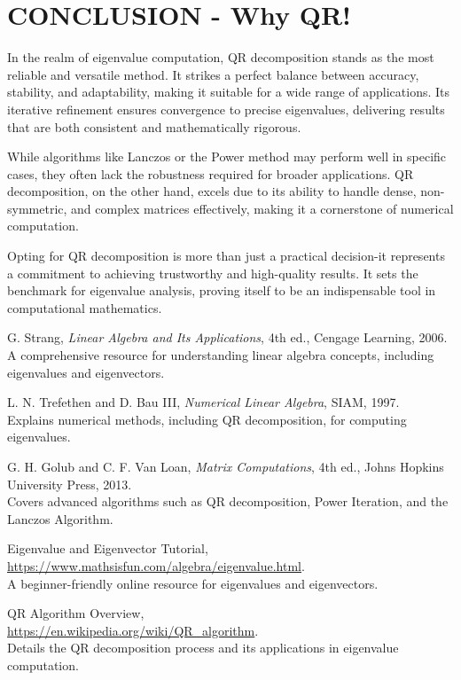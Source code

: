 \documentclass[journal]{IEEEtran}
\begin{document}
\section{CONCLUSION - Why QR!}
In the realm of eigenvalue computation, QR decomposition stands as the most reliable and versatile method. It strikes a perfect balance between accuracy, stability, and adaptability, making it suitable for a wide range of applications. Its iterative refinement ensures convergence to precise eigenvalues, delivering results that are both consistent and mathematically rigorous.

While algorithms like Lanczos or the Power method may perform well in specific cases, they often lack the robustness required for broader applications. QR decomposition, on the other hand, excels due to its ability to handle dense, non-symmetric, and complex matrices effectively, making it a cornerstone of numerical computation.

Opting for QR decomposition is more than just a practical decision-it represents a commitment to achieving trustworthy and high-quality results. It sets the benchmark for eigenvalue analysis, proving itself to be an indispensable tool in computational mathematics.\\

\begin{thebibliography}{9}

G. Strang, 
\textit{Linear Algebra and Its Applications}, 
4th ed., Cengage Learning, 2006. \\
A comprehensive resource for understanding linear algebra concepts, including eigenvalues and eigenvectors.

L. N. Trefethen and D. Bau III, 
\textit{Numerical Linear Algebra}, 
SIAM, 1997. \\
Explains numerical methods, including QR decomposition, for computing eigenvalues.

G. H. Golub and C. F. Van Loan, 
\textit{Matrix Computations}, 
4th ed., Johns Hopkins University Press, 2013. \\
Covers advanced algorithms such as QR decomposition, Power Iteration, and the Lanczos Algorithm.

Eigenvalue and Eigenvector Tutorial, \\
\url{https://www.mathsisfun.com/algebra/eigenvalue.html}. \\
A beginner-friendly online resource for eigenvalues and eigenvectors.

QR Algorithm Overview, \\
\url{https://en.wikipedia.org/wiki/QR_algorithm}. \\
Details the QR decomposition process and its applications in eigenvalue computation.

\end{thebibliography}
\end{document}
